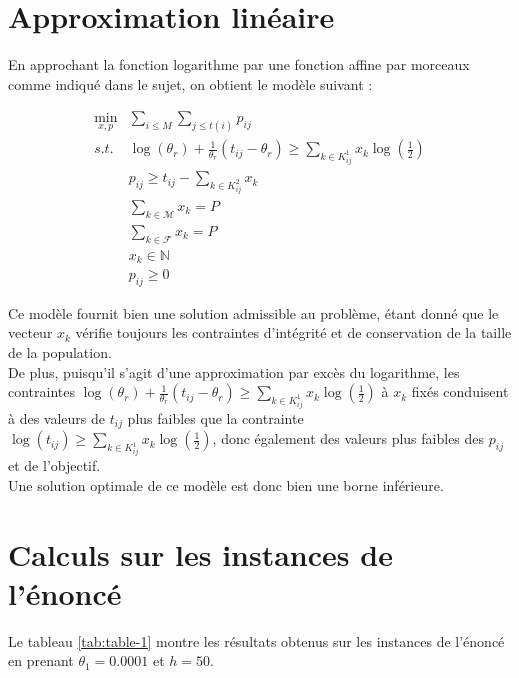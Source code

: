 \documentclass[12pt]{extarticle}
\begin{document}
\section{Approximation linéaire}

En approchant la fonction logarithme par une fonction affine par morceaux comme indiqué dans le sujet, on obtient le modèle suivant :

\begin{align*}
    \min_{x, p} &\sum_{i \leq M} \sum_{j \leq t(i)} p_{ij}\\
    s.t.   & \log(\theta_r) + \frac{1}{\theta_r}(t_{ij} - \theta_r) \geq \sum_{k \in K_{ij}^1} x_k \log\left(\frac{1}{2}\right)\\
           & p_{ij} \geq t_{ij} - \sum_{k \in K_{ij}^2} x_k     \\      
           & \sum_{k \in \mathcal{M}} x_k = P\\
           & \sum_{k \in \mathcal{F}} x_k = P\\
           & x_k \in \mathbb{N}\\
           & p_{ij} \geq 0
\end{align*}

Ce modèle fournit bien une solution admissible au problème, étant donné que le vecteur $x_k$ vérifie toujours les contraintes d'intégrité et de conservation de la taille de la population.\\
De plus, puisqu'il s'agit d'une approximation par excès du logarithme, les contraintes $\log(\theta_r) + \frac{1}{\theta_r}(t_{ij} - \theta_r) \geq \sum_{k \in K_{ij}^1} x_k \log\left(\frac{1}{2}\right)$ à $x_{k}$ fixés conduisent à des valeurs de $t_{ij}$ plus faibles que la contrainte $\log(t_{ij}) \geq \sum_{k \in K_{ij}^1} x_k \log\left(\frac{1}{2}\right)$, donc également des valeurs plus faibles des $p_{ij}$ et de l'objectif.\\
Une solution optimale de ce modèle est donc bien une borne inférieure.

\section{Calculs sur les instances de l'énoncé}

Le tableau \ref{tab:table-1} montre les résultats obtenus sur les instances de l'énoncé en prenant $\theta_1 = 0.0001$ et $h = 50$.
\end{document}
